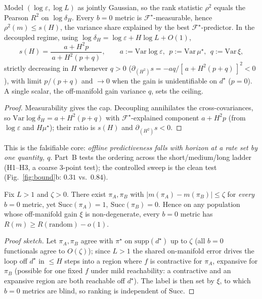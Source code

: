 \begin{theorem}\label{thm:pred}
Model $(\log\varepsilon,\log L)$ as jointly Gaussian, so the rank statistic $\rho^2$ equals the Pearson
$R^2$ on $\log\delta_H$. Every $b{=}0$ metric is $\mathcal F^\star$-measurable, hence
$\rho^2(m)\le s(H)$, the variance share explained by the best $\mathcal F^\star$-predictor. In the
decoupled regime, using $\log\delta_H=\log\varepsilon+H\log L+O(1)$,
\[ s(H)=\frac{a+H^2 p}{\,a+H^2(p+q)\,},\qquad a:=\mathrm{Var}\log\varepsilon,\ \ p:=\mathrm{Var}\,\mu^\star,\ \ q:=\mathrm{Var}\,\xi, \]
strictly decreasing in $H$ whenever $q>0$ ($\partial_{(H^2)}s=-aq/[\,a+H^2(p+q)\,]^2<0$), with limit
$p/(p+q)$ and $\to0$ when the gain is unidentifiable on $d^\star$ ($p{=}0$). A single scalar, the
off-manifold gain variance $q$, sets the ceiling.
\end{theorem}
\begin{proof}
Measurability gives the cap. Decoupling annihilates the cross-covariances, so
$\mathrm{Var}\log\delta_H=a+H^2(p+q)$ with $\mathcal F^\star$-explained component $a+H^2p$ (from
$\log\varepsilon$ and $H\mu^\star$); their ratio is $s(H)$ and $\partial_{(H^2)}s<0$.
\end{proof}

This is the falsifiable core: \emph{offline predictiveness falls with horizon at a rate set by one
quantity, $q$}. Part~B tests the ordering across the short/medium/long ladder (H1--H3, a coarse
$3$-point test); the controlled sweep is the clean test (Fig.~\ref{fig:bound}b: $0.31$ vs.\ $0.84$).

\begin{theorem}\label{thm:imposs}
Fix $L>1$ and $\zeta>0$. There exist $\pi_A,\pi_B$ with $|m(\pi_A)-m(\pi_B)|\le\zeta$ for \emph{every}
$b{=}0$ metric, yet $\mathrm{Succ}(\pi_A){=}1,\ \mathrm{Succ}(\pi_B){=}0$. Hence on any population whose
off-manifold gain $\xi$ is non-degenerate, every $b{=}0$ metric has $R(m)\ge R(\mathrm{random})-o(1)$.
\end{theorem}
\begin{proof}[Proof sketch]
Let $\pi_A,\pi_B$ agree with $\pi^\star$ on $\mathrm{supp}(d^\star)$ up to $\zeta$ (all $b{=}0$
functionals agree to $O(\zeta)$); since $L>1$ the shared on-manifold error drives the loop off
$d^\star$ in $\le H$ steps into a region where $f$ is contractive for $\pi_A$, expansive for $\pi_B$
(possible for one fixed $f$ under mild reachability: a contractive and an expansive region are both
reachable off $d^\star$). The label is then set by $\xi$, to which $b{=}0$ metrics are blind, so ranking
is independent of $\mathrm{Succ}$.
\end{proof}

